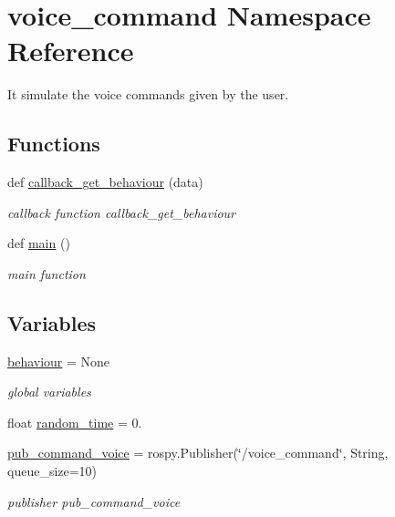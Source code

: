 \hypertarget{namespacevoice__command}{}\section{voice\+\_\+command Namespace Reference}
\label{namespacevoice__command}


It simulate the voice commands given by the user.  


\subsection*{Functions}
\begin{DoxyCompactItemize}
\item 
def \hyperlink{namespacevoice__command_a1a3b92c0f5ea62bc2f27000e4989c852}{callback\+\_\+get\+\_\+behaviour} (data)
\begin{DoxyCompactList}\small\item\em callback function callback\+\_\+get\+\_\+behaviour \end{DoxyCompactList}\item 
def \hyperlink{namespacevoice__command_a069123617bd541e9f291626ba8882858}{main} ()
\begin{DoxyCompactList}\small\item\em main function \end{DoxyCompactList}\end{DoxyCompactItemize}
\subsection*{Variables}
\begin{DoxyCompactItemize}
\item 
\hyperlink{namespacevoice__command_a72126e703aca1aefdf96b1e11085ed89}{behaviour} = None
\begin{DoxyCompactList}\small\item\em global variables \end{DoxyCompactList}\item 
float \hyperlink{namespacevoice__command_a43a92e567eb4143c1efb09aff88f4916}{random\+\_\+time} = 0.
\item 
\hyperlink{namespacevoice__command_a893d30fba12eb55a21111bdc1bab61d6}{pub\+\_\+command\+\_\+voice} = rospy.\+Publisher(\char`\"{}/voice\+\_\+command\char`\"{}, String, queue\+\_\+size=10)
\begin{DoxyCompactList}\small\item\em publisher pub\+\_\+command\+\_\+voice \end{DoxyCompactList}\end{DoxyCompactItemize}


